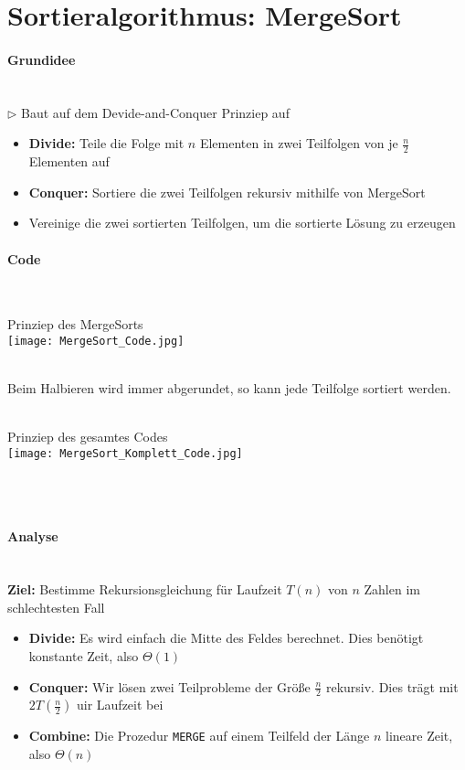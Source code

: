 \vspace{1.5cm}
\section{Sortieralgorithmus: MergeSort} %
	\label{MergeSort}

	\paragraph{Grundidee} \mbox{} \\
	$\rhd$ Baut auf dem Devide-and-Conquer Prinziep auf
	\begin{itemize}
		\item \textbf{Divide:} Teile die Folge mit $n$ Elementen in zwei Teilfolgen von je $\frac{n}{2}$ Elementen auf
		\item \textbf{Conquer:} Sortiere die zwei Teilfolgen rekursiv mithilfe von MergeSort
		\item Vereinige die zwei sortierten Teilfolgen, um die sortierte Lösung zu erzeugen
	\end{itemize}


	\paragraph{Code} \mbox{} \\

	\begin{center}
		Prinziep des MergeSorts \\
		\texttt{[image: MergeSort\_Code.jpg]}
	\end{center}
	\mbox{} \\
	Beim Halbieren wird immer abgerundet, so kann jede Teilfolge sortiert werden. \\ \\

	\begin{center}
		Prinziep des gesamtes Codes \\
		\texttt{[image: MergeSort\_Komplett\_Code.jpg]}
	\end{center}
	\mbox{} \\ \\


	\paragraph{Analyse} \mbox{} \\
	\textbf{Ziel:} Bestimme Rekursionsgleichung für Laufzeit $T(n)$ von $n$ Zahlen im schlechtesten Fall
	\begin{itemize}
		\item \textbf{Divide:} Es wird einfach die Mitte des Feldes berechnet. Dies benötigt konstante Zeit, also $\Theta(1)$
		\item \textbf{Conquer:} Wir lösen zwei Teilprobleme der Grö\ss e $\frac{n}{2}$ rekursiv. Dies trägt mit $2T(\frac{n}{2})$ uir Laufzeit bei
		\item \textbf{Combine:} Die Prozedur \texttt{MERGE} auf einem Teilfeld der Länge $n$ lineare Zeit, also $\Theta(n)$
	\end{itemize}

